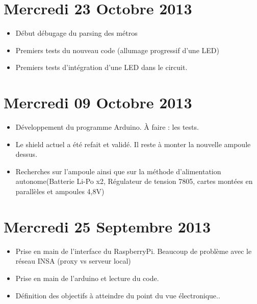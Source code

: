 \documentclass[a4paper, 12pt, french]{article}
\begin{document}

	\section*{Mercredi 23 Octobre 2013 } %
	\label{sec:mercredi_23_octobre_2013}
	\begin{itemize}
		\item Début débugage du parsing des métros 
		\item Premiers tests du nouveau code (allumage progressif d'une LED)
		\item Premiers tests d'intégration d'une LED dans le circuit.
	\end{itemize}
	

	\section*{Mercredi 09 Octobre 2013} %
	\label{sec:mercredi_09_octobre_2013}
	\begin{itemize}
		\item Développement du programme Arduino. À faire : les tests.
		\item Le shield actuel a été refait et validé. Il reste à monter la nouvelle ampoule dessus.
		\item Recherches sur l'ampoule ainsi que sur la méthode d'alimentation autonome(Batterie Li-Po x2, Régulateur de tension 7805, cartes montées en parallèles et ampoules 4,8V)
	\end{itemize}

	\section*{Mercredi 25 Septembre 2013} %
	\label{sec:mercredi_25_septembre_2013}
	\begin{itemize}
			\item Prise en main de l'interface du RaspberryPi. Beaucoup de problème avec le réseau INSA (proxy vs serveur local)
			\item Prise en main de l'arduino et lecture du code.
			\item Définition des objectifs à atteindre du point du vue électronique..
	\end{itemize}	
\end{document}

